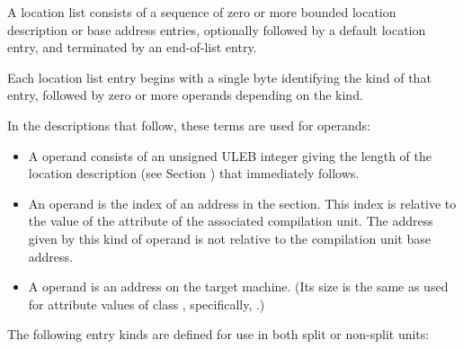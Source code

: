A location list consists of a sequence of zero or more bounded
location description or base address entries, optionally followed
by a default location entry, and terminated by an end-of-list
entry.

Each location list entry begins with a single byte identifying
the kind of that entry, followed by zero or more operands depending
on the kind.   
   
In the descriptions that follow, these terms are used for operands:
   
\begin{itemize}
\item A  operand consists of
\bb
an unsigned ULEB
\eb
integer giving the length of the location
description (see Section ) 
that immediately follows.

\item An  operand is the index of an address
in the \dotdebugaddr{} section. This index is relative to the
value of the \DWATaddrbase{} attribute of the associated
compilation unit. The address given by this kind
of operand is not relative to the compilation unit base address.
   
\item A  operand is an address on the target
machine. (Its size is the same as used for attribute values of
class \CLASSaddress, specifically, \DWFORMaddr.)

\end{itemize}
 
The following entry kinds are defined for use in both
split or non-split units:
   
